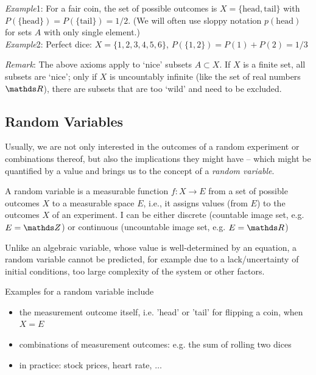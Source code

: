 \documentclass{notebook}
\makeatletter
\newcommand{\Remark}{\textit{Remark}} %
\newcommand{\Example}{\textit{Example}}
\makeatother
\begin{document}
\Example 1: For a fair coin, the set of possible outcomes is $X=\{\text{head},\text{tail}\}$
with $P(\{\text{head}\})=P(\{\text{tail}\})=1/2$. 
(We will often use sloppy notation $p(\text{head})$ for sets $A$ with only single element.)\\
\Example 2: Perfect dice: $X=\{1,2,3,4,5,6\}$, $P(\{1,2\})=P(1)+P(2)=1/3$

\Remark: The above axioms apply to `nice' subsets $A \subset X$. If $X$ is a finite set, all subsets are `nice'; only if $X$ is uncountably infinite (like the set of real numbers $\R$), there are subsets that are too `wild' and need to be excluded.


\subsection*{Random Variables}

Usually, we are not only interested in the outcomes of a random experiment or combinations thereof, but also the implications they might have – which might be quantified by a value and brings us to the concept of a \textit{random variable}.

\begin{theorem}
	A random variable is a measurable function $f:X \to E$ from a set of possible outcomes $X$ to a measurable space $E$, i.e., it assigns values (from $E$) to the outcomes $X$ of an experiment. I can be either discrete (countable image set, e.g. $E = \Z$) or continuous (uncountable image set, e.g. $E = \R$)

\end{theorem}
%
Unlike an algebraic variable, whose value is well-determined by an equation, a random variable cannot be predicted, for example due to a lack/uncertainty of initial conditions, too large complexity of the system or other factors. 

Examples for a random variable include 
%
\begin{itemize}
	\item the measurement outcome itself, i.e. 'head' or 'tail' for flipping a coin, when $X = E$
	\item combinations of measurement outcomes: e.g. the sum of rolling two dices 
	\item in practice: stock prices, heart rate, $\dots$ 
\end{itemize}
%
\end{document}
